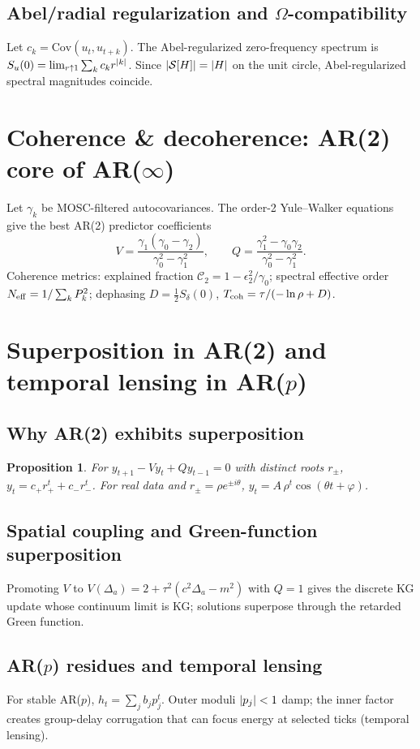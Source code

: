 \documentclass[12pt]{article}
\newtheorem{proposition}[theorem]{Proposition}
\theoremstyle{definition}
\newcommand{\Cov}{\mathrm{Cov}}
\DeclarePairedDelimiter{\abs}{\lvert}{\rvert}
\begin{document}
\subsection{Abel/radial regularization and $\Omega$-compatibility}
Let $c_k=\Cov(u_t,u_{t+k})$. The Abel-regularized zero-frequency spectrum is $S_u(0)=\lim_{r\uparrow1}\sum_k c_k r^{\abs{k}}$. Since $\abs{\mathcal S[H]}=\abs{H}$ on the unit circle, Abel-regularized spectral magnitudes coincide.

\section{Coherence \& decoherence: AR(2) core of AR($\infty$)}
Let $\gamma_k$ be MOSC-filtered autocovariances. The order-2 Yule--Walker equations give the best AR(2) predictor coefficients
\begin{equation}
V=\frac{\gamma_1(\gamma_0-\gamma_2)}{\gamma_0^2-\gamma_1^2},\qquad
Q=\frac{\gamma_1^2-\gamma_0\gamma_2}{\gamma_0^2-\gamma_1^2}.
\end{equation}
Coherence metrics: explained fraction $\mathcal C_2=1-\epsilon_2^2/\gamma_0$; spectral effective order $N_{\rm eff}=1/\sum_k P_k^2$; dephasing $D=\tfrac12 S_\delta(0)$, $T_{\rm coh}=\tau/(-\ln\rho+D)$.

\section{Superposition in AR(2) and temporal lensing in AR($p$)}\label{sec:superposition}
\subsection{Why AR(2) exhibits superposition}
\begin{proposition}
For $y_{t+1}-Vy_t+Qy_{t-1}=0$ with distinct roots $r_\pm$, $y_t=c_+ r_+^t+c_- r_-^t$. For real data and $r_\pm=\rho e^{\pm i\theta}$, $y_t=A\,\rho^t\cos(\theta t+\varphi)$.
\end{proposition}

\subsection{Spatial coupling and Green-function superposition}
Promoting $V$ to $V(\Delta_a)=2+\tau^2(c^2\Delta_a-m^2)$ with $Q=1$ gives the discrete KG update whose continuum limit is KG; solutions superpose through the retarded Green function.

\subsection{AR($p$) residues and temporal lensing}
For stable AR($p$), $h_t=\sum_j b_j p_j^t$. Outer moduli $\abs{p_j}<1$ damp; the inner factor creates group-delay corrugation that can focus energy at selected ticks (temporal lensing).
\end{document}
